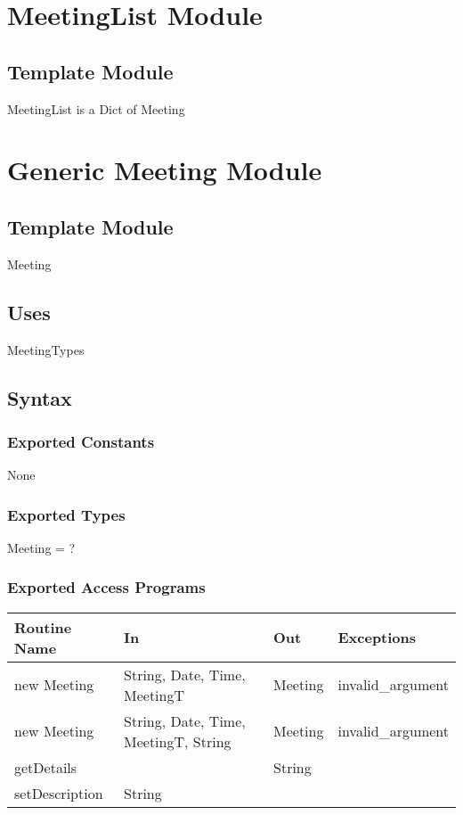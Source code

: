 \documentclass[12pt, titlepage]{article}
\begin{document}
\newpage
\section* {MeetingList Module}

\subsection*{Template Module}
MeetingList is a Dict of Meeting

\newpage

\section* {Generic Meeting Module}

\subsection*{Template Module}

Meeting

\subsection* {Uses}

MeetingTypes

\subsection* {Syntax}

\subsubsection* {Exported Constants}

None

\subsubsection* {Exported Types}

Meeting = ?

\subsubsection* {Exported Access Programs}

\begin{tabular}{|l|l|l|l|}
    \hline
    \textbf{Routine Name} & \textbf{In} & \textbf{Out} & \textbf{Exceptions} \\
    \hline
    new Meeting & String, Date, Time, MeetingT & Meeting & invalid\_argument\\
    \hline
    new Meeting & String, Date, Time, MeetingT, String & Meeting & invalid\_argument\\
    \hline
    getDetails & & String &\\
    \hline
    setDescription & String & & \\
    \hline
\end{tabular}
\end{document}
